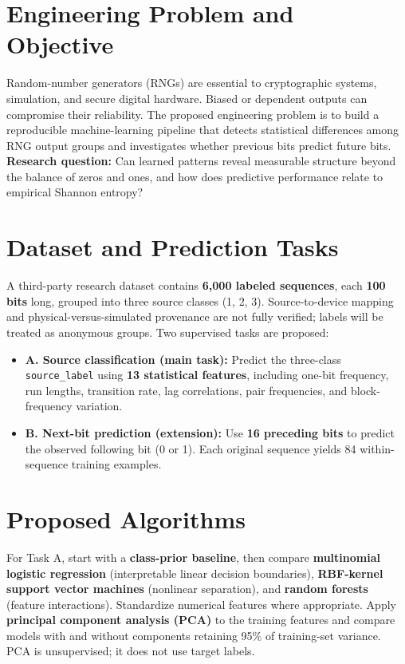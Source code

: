 \documentclass[11pt,letterpaper,twocolumn]{article}
\begin{document}
\section{Engineering Problem and Objective}
Random-number generators (RNGs) are essential to cryptographic systems, simulation, and secure digital hardware. Biased or dependent outputs can compromise their reliability. The proposed engineering problem is to build a reproducible machine-learning pipeline that detects statistical differences among RNG output groups and investigates whether previous bits predict future bits. \textbf{Research question:} Can learned patterns reveal measurable structure beyond the balance of zeros and ones, and how does predictive performance relate to empirical Shannon entropy?

\section{Dataset and Prediction Tasks}
A third-party research dataset contains \textbf{6,000 labeled sequences}, each \textbf{100 bits} long, grouped into three source classes (1, 2, 3). Source-to-device mapping and physical-versus-simulated provenance are not fully verified; labels will be treated as anonymous groups. Two supervised tasks are proposed:
\begin{itemize}
\item \textbf{A. Source classification (main task):} Predict the three-class \texttt{source\_label} using \textbf{13 statistical features}, including one-bit frequency, run lengths, transition rate, lag correlations, pair frequencies, and block-frequency variation.
\item \textbf{B. Next-bit prediction (extension):} Use \textbf{16 preceding bits} to predict the observed following bit (0 or 1). Each original sequence yields 84 within-sequence training examples.
\end{itemize}
\section{Proposed Algorithms}
For Task A, start with a \textbf{class-prior baseline}, then compare \textbf{multinomial logistic regression} (interpretable linear decision boundaries), \textbf{RBF-kernel support vector machines} (nonlinear separation), and \textbf{random forests} (feature interactions). Standardize numerical features where appropriate. Apply \textbf{principal component analysis (PCA)} to the training features and compare models with and without components retaining 95\% of training-set variance. PCA is unsupervised; it does not use target labels.
\end{document}
